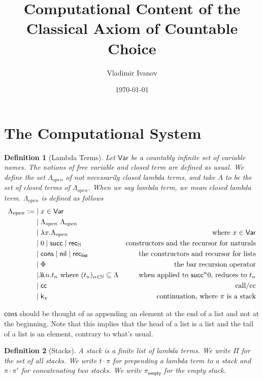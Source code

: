 \documentclass{article}
\title{Computational Content of the Classical Axiom of Countable Choice}
\author{Vladimir Ivanov}
\date{\today}
\newcommand{\successor}{\mathsf{succ}}
\newcommand{\N}{\mathbb{N}}
\newcommand{\recN}{\mathsf{rec}_{\mathbb{N}}}
\newcommand{\bool}{\mathsf{bool}}
\newcommand{\true}{\mathsf{true}}
\newcommand{\false}{\mathsf{false}}
\newcommand{\recbool}{\mathsf{rec_{bool}}}
\newcommand{\emptystack}{\pi_\mathsf{empty}}
\newcommand{\oracle}[2]{\lambda\mkern-15mu\lambda\ #1. #2}
\newcommand{\cc}{\mathsf{cc}}
\newcommand{\cont}{\mathsf{k}}
\newcommand{\cons}{\mathsf{cons}}
\newcommand{\nil}{\mathsf{nil}}
\newcommand{\reclist}{\mathsf{rec}_\mathsf{list}}
\newtheorem{definition}{Definition}
\begin{document}
    
\maketitle

\section{The Computational System}

\begin{definition}[Lambda Terms]
    Let $\mathsf{Var}$ be a countably infinite set of variable names.
    The notions of free variable and closed term are defined as usual.
    We define the set $\Lambda_{open}$ of not necessarily closed lambda terms, and take $\Lambda$ to be the set of closed terms of $\Lambda_{open}$. When we say lambda term, we mean closed lambda term. $\Lambda_{open}$ is defined as follows
    \begin{align*}
        \Lambda_{open} := & \mid x \in \mathsf{Var} \\
        & \mid \Lambda_{open}\ \Lambda_{open} \\
        & \mid \lambda x. \Lambda_{open} & \text{where $x \in \mathsf{Var}$} \\
        & \mid 0 \mid \successor \mid \recN & \text{constructors and the recursor for naturals} \\
        & \mid \cons \mid \nil \mid \reclist & \text{the constructors and recursor for lists} \\
        & \mid \Phi & \text{the bar recursion operator} \\
        & \mid \oracle{n}{t_n} \text{ where $(t_n)_{n \in \N} \subseteq \Lambda$} & \text{when applied to $\successor^n 0$, reduces to $t_n$} \\
        & \mid \cc & \text{call/cc} \\
        & \mid \cont_\pi & \text{continuation, where $\pi$ is a stack}
    \end{align*}
\end{definition}

$\cons$ should be thought of as appending an element at the end of a list and not at the beginning. Note that this implies that the head of a list is a list and the tail of a list is an element, contrary to what's usual.

\begin{definition}[Stacks]
    A stack is a finite list of lambda terms.
    We write $\Pi$ for the set of all stacks.
    We write $t \cdot \pi$ for prepending a lambda term to a stack and $\pi \cdot \pi'$ for concatenating two stacks. We write $\emptystack$ for the empty stack.
\end{definition}
\end{document}
